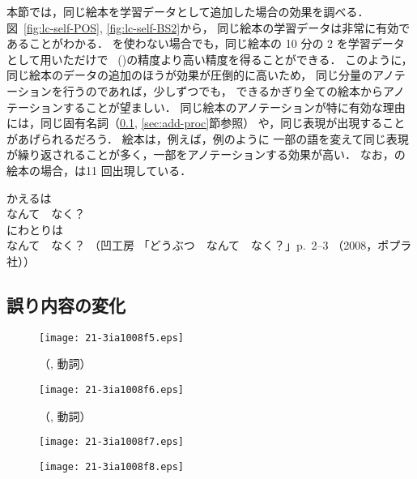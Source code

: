 \documentclass[japanese]{jnlp_1.4}
\newcommand{\kodomo}{}
\newcommand{\kytea}{}
\newcommand{\random}{}
\newcommand{\bestHINOKI}{}
\newcommand{\refs}[1]{}
\newcommand{\ul}{}
\begin{document}
本節では，同じ絵本を学習データとして追加した場合の効果を調べる．
図~\ref{fig:lc-self-POS}, \ref{fig:lc-self-BS2}から，
同じ絵本の学習データは非常に有効であることがわかる．
\bestHINOKI を使わない場合でも，同じ絵本の 10 分の 2 を学習データとして用いただけで
\kytea\ (\bestHINOKI)の精度より高い精度を得ることができる．
このように，同じ絵本のデータの追加のほうが効果が圧倒的に高いため，
同じ分量のアノテーションを行うのであれば，少しずつでも，
できるかぎり全ての絵本からアノテーションすることが望ましい．
同じ絵本のアノテーションが特に有効な理由には，同じ固有名詞（\ref{sec:errors}, \ref{sec:add-proc}節参照）
や，同じ表現が出現することがあげられるだろう．
絵本は，例えば，例\refs{ex-repeat}のように
一部の語を変えて同じ表現が繰り返されることが多く，一部をアノテーションする効果が高い．
なお，\refs{ex-repeat}の絵本の場合，\jpn[なんて　なく？]{}は11 回出現している．

 \begin{exe} 
 \ex \label{s:ex-repeat}
 かえるは\\
 \ul{なんて　なく？}\\
 にわとりは\\
 \ul{なんて　なく？} \hspace{5mm}
\small （凹工房 「どうぶつ　なんて　なく？」p.~2--3 （2008，ポプラ社））
 \end{exe}


\subsection{誤り内容の変化}
\label{sec:errors}

\newcommand{\COM}{}

\begin{figure}[b]
 \begin{minipage}{0.48\hsize}
   \begin{center}
    \texttt{[image: 21-3ia1008f5.eps]}
   \end{center}
  \caption{\COM（\kodomo, 動詞）}
   \label{fig:lc-self-err-VERB}
 \end{minipage}
\hfill
 \begin{minipage}{0.48\hsize}
   \begin{center}
    \texttt{[image: 21-3ia1008f6.eps]}
   \end{center}
  \caption{\COM（\random, 動詞）}
   \label{fig:lc-rand-err-VERB}
 \end{minipage}
\end{figure}
\begin{figure}[b]
\setlength{\captionwidth}{197pt}
 \begin{minipage}{199pt}
    \texttt{[image: 21-3ia1008f7.eps]}
  \hangcaption{\COM（\kodomo, 名詞-固有名詞）}
   \label{fig:lc-self-err-PROP}
 \end{minipage}
\hfill
 \begin{minipage}{199pt}
    \texttt{[image: 21-3ia1008f8.eps]}
  \hangcaption{\COM（\random, 名詞-固有名詞）}
   \label{fig:lc-rand-err-PROP}
 \end{minipage}
\end{figure}
\end{document}
